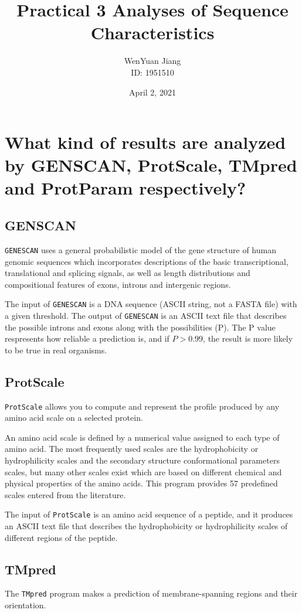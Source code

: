 \documentclass[en,black,10pt,normal]{elegantnote}
\title{Practical 3 Analyses of Sequence Characteristics}
\author{WenYuan Jiang\\ID: 1951510}
\institute{School of Life Science, Tongji University}
\date{April 2, 2021}
\newcommand{\upcite}[1]{\textsuperscript{\textsuperscript{\cite{#1}}}}
\begin{document}
\maketitle

\section{What kind of results are analyzed by GENSCAN, ProtScale, TMpred and ProtParam respectively?}
\subsection{GENSCAN}
\texttt{GENESCAN} uses a general probabilistic model of the gene structure of human genomic sequences which incorporates descriptions of the basic transcriptional, 
translational and splicing signals, 
as well as length distributions and compositional features of exons, 
introns and intergenic regions.\upcite{burge1997prediction}

The input of \texttt{GENESCAN} is a DNA sequence (ASCII string, not a FASTA file) with a given threshold.
The output of \texttt{GENESCAN} is an ASCII text file that describes the possible introns and exons along with the possibilities (P).
The P value respresents how reliable a prediction is, and if $P>0.99$, the result is more likely to be true in real organisms.

\subsection{ProtScale}
\texttt{ProtScale} allows you to compute and represent the profile produced by any amino acid scale on a selected protein.

An amino acid scale is defined by a numerical value assigned to each type of amino acid. 
The most frequently used scales are the hydrophobicity or hydrophilicity scales and the secondary structure conformational parameters scales, 
but many other scales exist which are based on different chemical and physical properties of the amino acids. 
This program provides 57 predefined scales entered from the literature. \upcite{gasteiger2005protein}

The input of \texttt{ProtScale} is an amino acid sequence of a peptide, and it produces an ASCII text file that describes
the hydrophobicity or hydrophilicity scales of different regions of the peptide.

\subsection{TMpred}
The \texttt{TMpred} program makes a prediction of membrane-spanning regions and their orientation.\upcite{hofmann1993tmbase}
\end{document}
